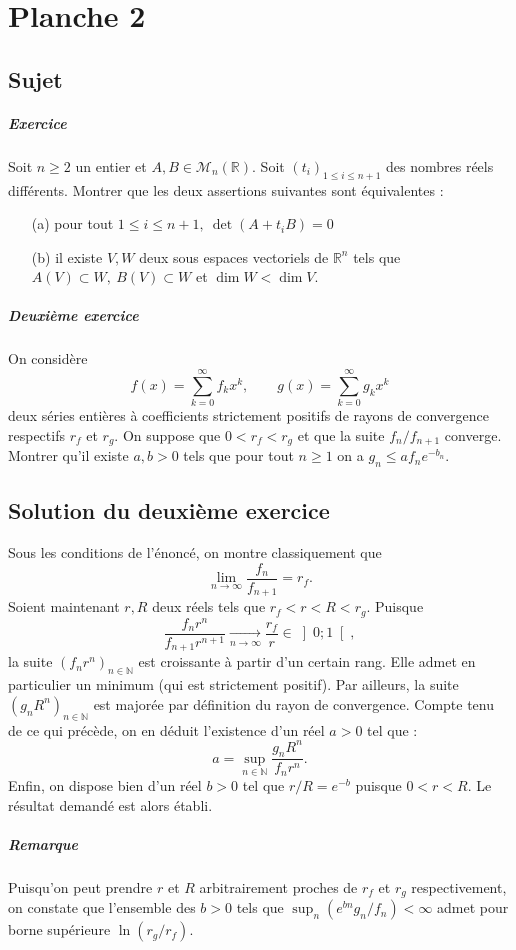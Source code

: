 \chapter{Planche 2}

\section{Sujet}

\paragraph{Exercice}
Soit $n \geqslant 2$ un entier et $A,B \in \mathscr M_n(\mathbb R)$. Soit $(t_i)_{1\leqslant i \leqslant n+1}$ des nombres réels différents. Montrer que les deux assertions suivantes sont équivalentes :
\begin{enumerate}
    \item[(a)] pour tout $1 \leqslant i \leqslant n+1,\ \det(A+t_iB) = 0$
    \item[(b)] il existe $V,W$ deux sous espaces vectoriels de $\mathbb R^n$ tels que $A(V) \subset W,\ B(V) \subset W$ et $\dim W < \dim V$.
\end{enumerate}
\paragraph{Deuxième exercice}
On considère
$$
f(x) = \sum_{k=0}^{\infty} f_k x^k,
\qquad
g(x) = \sum_{k=0}^{\infty} g_k x^k
$$
deux séries entières à coefficients strictement positifs de rayons de convergence respectifs $r_f$ et $r_g$.
On suppose que $0 < r_f < r_g$ et que la suite $f_n/f_{n+1}$ converge.
Montrer qu'il existe $a,b > 0$ tels que pour tout $n \geqslant 1$ on a $g_n \leqslant a f_n e^{-b_n}$.

\section{Solution du deuxième exercice}

Sous les conditions de l'énoncé, on montre classiquement que
\[
\lim_{n\to\infty} \frac{f_n}{f_{n+1}} = r_f.
\]
Soient maintenant $r,R$ deux réels tels que $r_f < r < R < r_g$. Puisque
$$
\frac{f_n r^n}{f_{n+1}r^{n+1}} \xrightarrow[n\to\infty]{} \frac{r_f}{r} \in \left]0;1\right[,
$$
la suite $(f_n r^n)_{n\in\mathbb N}$ est croissante à partir d'un certain rang. Elle admet en particulier un minimum (qui est strictement positif).
Par ailleurs, la suite $(g_n R^n)_{n\in\mathbb N}$ est majorée par définition du rayon de convergence. Compte tenu de ce qui précède, on en déduit l'existence d'un réel $a > 0$ tel que :
$$
a = \sup_{n\in\mathbb N} \frac{g_n R^n}{f_n r^n}.
$$
Enfin, on dispose bien d'un réel $b > 0$ tel que $r/R = e^{-b}$ puisque $0 < r < R$.
Le résultat demandé est alors établi.

\paragraph{Remarque}
Puisqu'on peut prendre $r$ et $R$ arbitrairement proches de $r_f$ et $r_g$ respectivement, on constate que l'ensemble des $b > 0$ tels que $\sup_n (e^{bn} g_n/f_n) < \infty$ admet pour borne supérieure $\ln(r_g/r_f)$.
